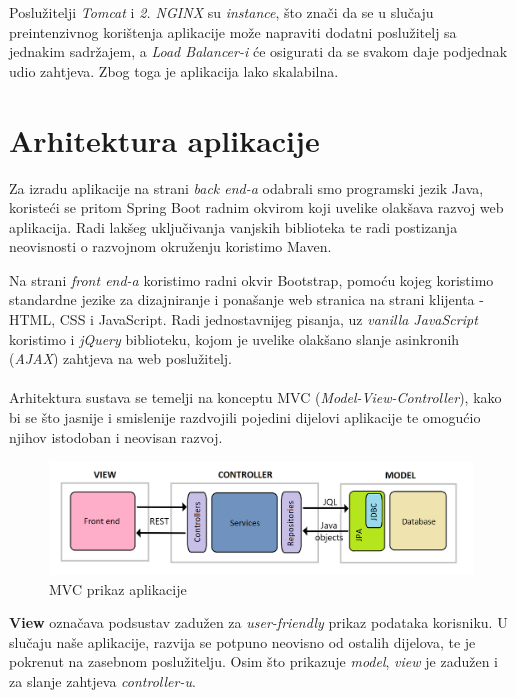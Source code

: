 		Poslužitelji \textit{Tomcat} i \textit{2. NGINX} su \textit{instance}, što znači da se u slučaju preintenzivnog korištenja aplikacije može napraviti dodatni poslužitelj sa jednakim sadržajem, a \textit{Load Balancer-i} će osigurati da se svakom daje podjednak udio zahtjeva. Zbog toga je aplikacija lako skalabilna.
		
		\section{Arhitektura aplikacije}
		Za izradu aplikacije na strani \textit{back end-a} odabrali smo programski jezik Java, koristeći se pritom Spring Boot radnim okvirom koji uvelike olakšava razvoj web aplikacija. Radi lakšeg uključivanja vanjskih biblioteka te radi postizanja neovisnosti o razvojnom okruženju koristimo Maven.
		
		Na strani \textit{front end-a} koristimo radni okvir Bootstrap, pomoću kojeg koristimo standardne jezike za dizajniranje i ponašanje web stranica na strani klijenta - HTML, CSS i JavaScript. Radi jednostavnijeg pisanja, uz \textit{vanilla JavaScript} koristimo i \textit{jQuery} biblioteku, kojom je uvelike olakšano slanje asinkronih (\textit{AJAX}) zahtjeva na web poslužitelj.\\
		\\
		Arhitektura sustava se temelji na konceptu MVC (\textit{Model-View-Controller}), kako bi se što jasnije i smislenije razdvojili pojedini dijelovi aplikacije te omogućio njihov istodoban i neovisan razvoj. 
		\begin{figure}[H]
			\includegraphics[scale=0.5]{figures/MVC.png}
			\centering
			\caption{MVC prikaz aplikacije}
			\label{fig:mvc}
		\end{figure}
		
		\textbf{View} označava podsustav zadužen za \textit{user-friendly} prikaz podataka korisniku. U slučaju naše aplikacije, razvija se potpuno neovisno od ostalih dijelova, te je pokrenut na zasebnom poslužitelju. Osim što prikazuje \textit{model}, \textit{view} je zadužen i za slanje zahtjeva \textit{controller-u}. 
		
